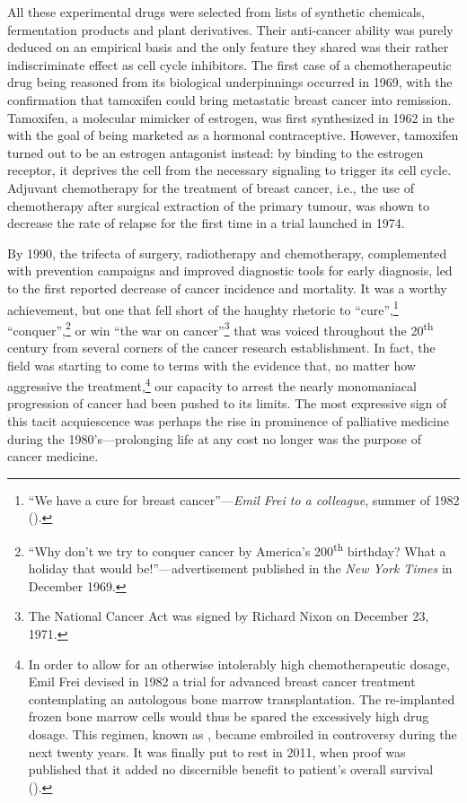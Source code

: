 All these experimental drugs were selected from lists of synthetic chemicals,
fermentation products and plant derivatives.  Their anti-cancer ability was
purely deduced on an empirical basis and the only feature they shared was their
rather indiscriminate effect as cell cycle inhibitors.  The first case of a
chemotherapeutic drug being reasoned from its biological underpinnings occurred
in 1969, with the confirmation that tamoxifen could bring metastatic breast
cancer into remission.\cite{cole_new_1971} Tamoxifen, a molecular mimicker of
estrogen, was first synthesized in 1962 in the  with the goal of
being marketed as a hormonal contraceptive.  However, tamoxifen turned out to be
an estrogen antagonist instead: by binding to the estrogen receptor, it deprives
the cell from the necessary signaling to trigger its cell
cycle.\cite{jordan_effects_1977} Adjuvant chemotherapy for the treatment of
breast cancer, i.e., the use of chemotherapy after surgical extraction of the
primary tumour, was shown to decrease the rate of relapse for the first time in
a trial launched in 1974.\cite{bonadonna_combination_1976}

By 1990, the trifecta of surgery, radiotherapy and chemotherapy, complemented
with prevention campaigns and improved diagnostic tools for early diagnosis, led
to the first reported decrease of cancer incidence and
mortality.\cite{devita_two_2012} It was a worthy achievement, but one that fell
short of the haughty rhetoric to ``cure'',\footnote{``We have a cure for breast
  cancer''---\emph{Emil Frei to a colleague}, summer of 1982
  (\citealp{mukherjee_emperor_2011}).} ``conquer'',\footnote{``Why don't we try
  to conquer cancer by America's 200\textsuperscript{th} birthday? What a
  holiday that would be!''---advertisement published in the \emph{New York
    Times} in December 1969.} or win ``the war on cancer''\footnote{The National
  Cancer Act was signed by Richard Nixon on December 23, 1971.} that was voiced
throughout the 20\textsuperscript{th} century from several corners of the cancer
research establishment.  In fact, the field was starting to come to terms with
the evidence that, no matter how aggressive the treatment,\footnote{In order to
  allow for an otherwise intolerably high chemotherapeutic dosage, Emil Frei
  devised in 1982 a trial for advanced breast cancer treatment contemplating an
  autologous bone marrow transplantation.  The re-implanted frozen bone marrow
  cells would thus be spared the excessively high drug dosage.  This regimen,
  known as , became embroiled in controversy during the next
  twenty years.  It was finally put to rest in 2011, when proof was published
  that it added no discernible benefit to patient's overall survival
  (\citealp{berry_high-dose_2011}).} our capacity to arrest the nearly
monomaniacal progression of cancer had been pushed to its limits.  The most
expressive sign of this tacit acquiescence was perhaps the rise in prominence of
palliative medicine during the 1980's---prolonging life at any cost no longer
was the purpose of cancer medicine.

